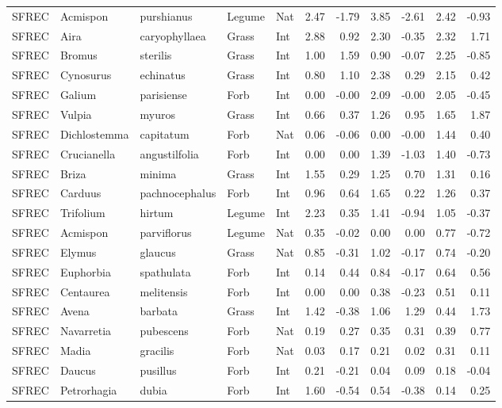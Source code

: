 \documentclass[twoside,12pt,final]{ucthesis-CA2012}
\begin{document}
\begin{ucmainmatter}
\begin{table}[ht]
{\begin{tabular}{lllllrrrrrr}
  SFREC & Acmispon & purshianus & Legume & Nat & 2.47 & -1.79 & 3.85 & -2.61 & 2.42 & -0.93 \\ 
  SFREC & Aira & caryophyllaea & Grass & Int & 2.88 & 0.92 & 2.30 & -0.35 & 2.32 & 1.71 \\ 
  SFREC & Bromus & sterilis & Grass & Int & 1.00 & 1.59 & 0.90 & -0.07 & 2.25 & -0.85 \\ 
  SFREC & Cynosurus & echinatus & Grass & Int & 0.80 & 1.10 & 2.38 & 0.29 & 2.15 & 0.42 \\ 
  SFREC & Galium & parisiense & Forb & Int & 0.00 & -0.00 & 2.09 & -0.00 & 2.05 & -0.45 \\ 
  SFREC & Vulpia & myuros & Grass & Int & 0.66 & 0.37 & 1.26 & 0.95 & 1.65 & 1.87 \\ 
  SFREC & Dichlostemma & capitatum & Forb & Nat & 0.06 & -0.06 & 0.00 & -0.00 & 1.44 & 0.40 \\ 
  SFREC & Crucianella & angustilfolia & Forb & Int & 0.00 & 0.00 & 1.39 & -1.03 & 1.40 & -0.73 \\ 
  SFREC & Briza & minima & Grass & Int & 1.55 & 0.29 & 1.25 & 0.70 & 1.31 & 0.16 \\ 
  SFREC & Carduus & pachnocephalus & Forb & Int & 0.96 & 0.64 & 1.65 & 0.22 & 1.26 & 0.37 \\ 
  SFREC & Trifolium & hirtum & Legume & Int & 2.23 & 0.35 & 1.41 & -0.94 & 1.05 & -0.37 \\ 
  SFREC & Acmispon & parviflorus & Legume & Nat & 0.35 & -0.02 & 0.00 & 0.00 & 0.77 & -0.72 \\ 
  SFREC & Elymus & glaucus & Grass & Nat & 0.85 & -0.31 & 1.02 & -0.17 & 0.74 & -0.20 \\ 
  SFREC & Euphorbia & spathulata & Forb & Int & 0.14 & 0.44 & 0.84 & -0.17 & 0.64 & 0.56 \\ 
  SFREC & Centaurea & melitensis & Forb & Int & 0.00 & 0.00 & 0.38 & -0.23 & 0.51 & 0.11 \\ 
  SFREC & Avena & barbata & Grass & Int & 1.42 & -0.38 & 1.06 & 1.29 & 0.44 & 1.73 \\ 
  SFREC & Navarretia & pubescens & Forb & Nat & 0.19 & 0.27 & 0.35 & 0.31 & 0.39 & 0.77 \\ 
  SFREC & Madia & gracilis & Forb & Nat & 0.03 & 0.17 & 0.21 & 0.02 & 0.31 & 0.11 \\ 
  SFREC & Daucus & pusillus & Forb & Int & 0.21 & -0.21 & 0.04 & 0.09 & 0.18 & -0.04 \\ 
  SFREC & Petrorhagia & dubia & Forb & Int & 1.60 & -0.54 & 0.54 & -0.38 & 0.14 & 0.25 \\ 

\end{tabular}}
\end{table}
\end{ucmainmatter}
\end{document}
